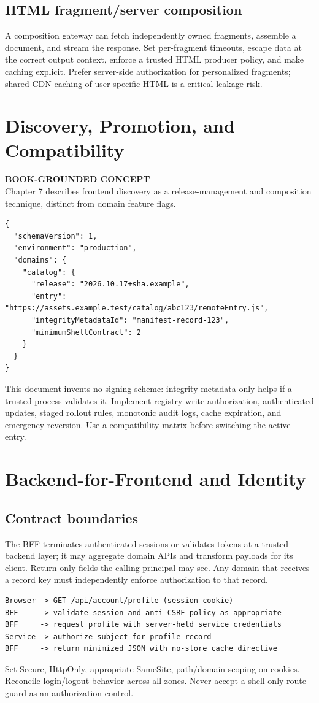 \documentclass[11pt,letterpaper,oneside]{report}
\newcommand{\based}[1]{\begin{sourcebox}\textbf{BOOK-GROUNDED CONCEPT}\\#1\end{sourcebox}}
\begin{document}
\section{HTML fragment/server composition}
A composition gateway can fetch independently owned fragments, assemble a document, and stream the response. Set per-fragment timeouts, escape data at the correct output context, enforce a trusted HTML producer policy, and make caching explicit. Prefer server-side authorization for personalized fragments; shared CDN caching of user-specific HTML is a critical leakage risk.
\chapter{Discovery, Promotion, and Compatibility}
\based{Chapter 7 describes frontend discovery as a release-management and composition technique, distinct from domain feature flags.}
\begin{lstlisting}[caption={Illustrative discovery manifest (not the book schema)}]
{
  "schemaVersion": 1,
  "environment": "production",
  "domains": {
    "catalog": {
      "release": "2026.10.17+sha.example",
      "entry": "https://assets.example.test/catalog/abc123/remoteEntry.js",
      "integrityMetadataId": "manifest-record-123",
      "minimumShellContract": 2
    }
  }
}
\end{lstlisting}
This document invents no signing scheme: integrity metadata only helps if a trusted process validates it. Implement registry write authorization, authenticated updates, staged rollout rules, monotonic audit logs, cache expiration, and emergency reversion. Use a compatibility matrix before switching the active entry.
\chapter{Backend-for-Frontend and Identity}
\section{Contract boundaries}
The BFF terminates authenticated sessions or validates tokens at a trusted backend layer; it may aggregate domain APIs and transform payloads for its client. Return only fields the calling principal may see. Any domain that receives a record key must independently enforce authorization to that record.
\begin{lstlisting}[caption={Illustrative HTTP flow}]
Browser -> GET /api/account/profile (session cookie)
BFF     -> validate session and anti-CSRF policy as appropriate
BFF     -> request profile with server-held service credentials
Service -> authorize subject for profile record
BFF     -> return minimized JSON with no-store cache directive
\end{lstlisting}
Set Secure, HttpOnly, appropriate SameSite, path/domain scoping on cookies. Reconcile login/logout behavior across all zones. Never accept a shell-only route guard as an authorization control.
\end{document}

